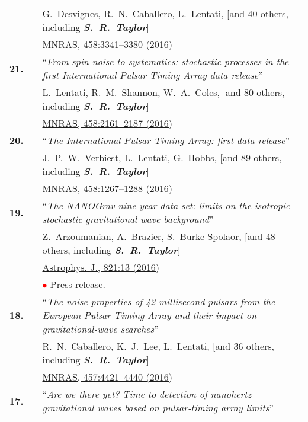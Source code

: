 \documentclass[11pt,letterpaper,sans]{moderncv}
\begin{document}
{\begin{longtable}{rp{0.3cm}p{15.8cm}}
&& G.~Desvignes, R.~N.~Caballero, L.~Lentati, [and 40 others, including \textit{\textbf{S.~R.~Taylor}}] \\ 
&&  \href{http://mnras.oxfordjournals.org/content/458/3/3341}{{\color{color1} MNRAS, 458:3341--3380 (2016)}} \vspace{0.09cm}\\
\textbf{21.} & & ``\textit{From spin noise to systematics: stochastic processes in the first International Pulsar Timing Array data release}'' \\ 
&& L.~Lentati, R.~M.~Shannon, W.~A.~Coles, [and 80 others, including \textit{\textbf{S.~R.~Taylor}}] \\ 
&&  \href{http://mnras.oxfordjournals.org/content/458/2/2161}{{\color{color1} MNRAS, 458:2161--2187 (2016)}} \vspace{0.09cm}\\
\textbf{20.} & & ``\textit{The International Pulsar Timing Array: first data release}'' \\ 
&& J.~P.~W.~Verbiest, L.~Lentati, G.~Hobbs, [and 89 others, including \textit{\textbf{S.~R.~Taylor}}] \\ 
&&  \href{http://mnras.oxfordjournals.org/content/458/2/1267}{{\color{color1} MNRAS, 458:1267--1288 (2016)}} \vspace{0.09cm}\\
\textbf{19.} & & ``\textit{The NANOGrav nine-year data set: limits on the isotropic stochastic gravitational wave background}'' \\ 
&& Z.~Arzoumanian, A.~Brazier, S.~Burke-Spolaor, [and 48 others, including \textit{\textbf{S.~R.~Taylor}}] \\ 
&&  \href{http://iopscience.iop.org/article/10.3847/0004-637X/821/1/13/meta}{{\color{color1} Astrophys. J., 821:13 (2016)}} \\
&& \textcolor{red}{$\bullet$} Press release. \vspace{0.09cm}\\
\textbf{18.} & & ``\textit{The noise properties of 42 millisecond pulsars from the European Pulsar Timing Array and their impact on gravitational-wave searches}'' \\ 
&& R.~N.~Caballero, K.~J.~Lee, L.~Lentati, [and 36 others, including \textit{\textbf{S.~R.~Taylor}}] \\ 
&&  \href{http://mnras.oxfordjournals.org/content/457/4/4421}{{\color{color1} MNRAS, 457:4421--4440 (2016)}} \vspace{0.09cm}\\
\textbf{17.} & & ``\textit{Are we there yet? Time to detection of nanohertz gravitational waves based on pulsar-timing array limits}'' \\ 

\end{longtable}}
\end{document}
